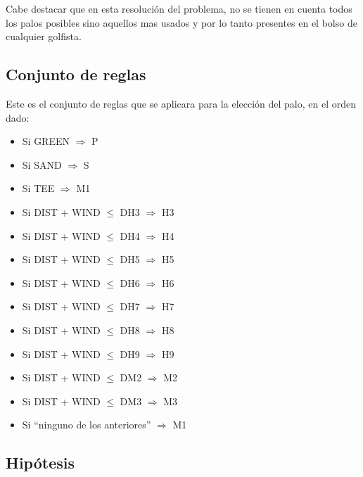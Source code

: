 \documentclass[runningheads,a4paper]{llncs}
\begin{document}
Cabe destacar que en esta resolución del problema, no se tienen en cuenta todos los palos posibles sino aquellos mas usados y por lo tanto presentes en el bolso de cualquier golfista.\\
\subsection{Conjunto de reglas}
Este es el conjunto de reglas que se aplicara para la elección del palo, en el orden dado:
\begin{itemize}

	\item Si GREEN $\Rightarrow$ P 
	
	\item Si SAND $\Rightarrow$ S
	
	\item Si TEE $\Rightarrow$ M1 
	
	\item Si DIST + WIND $\leq$ DH3 $\Rightarrow$ H3 
	
	\item Si DIST + WIND $\leq$ DH4 $\Rightarrow$ H4 
	
	\item Si DIST + WIND $\leq$ DH5 $\Rightarrow$ H5 
	
	\item Si DIST + WIND $\leq$ DH6 $\Rightarrow$ H6 
	
	\item Si DIST + WIND $\leq$ DH7 $\Rightarrow$ H7 
	
	\item Si DIST + WIND $\leq$ DH8 $\Rightarrow$ H8 
	
	\item Si DIST + WIND $\leq$ DH9 $\Rightarrow$ H9 
	
	\item Si DIST + WIND $\leq$ DM2 $\Rightarrow$ M2
	
	\item Si DIST + WIND $\leq$ DM3 $\Rightarrow$ M3
	
	\item Si “ninguno de los anteriores” $\Rightarrow$ M1
	
\end{itemize}


\subsection{Hipótesis}
\end{document}
